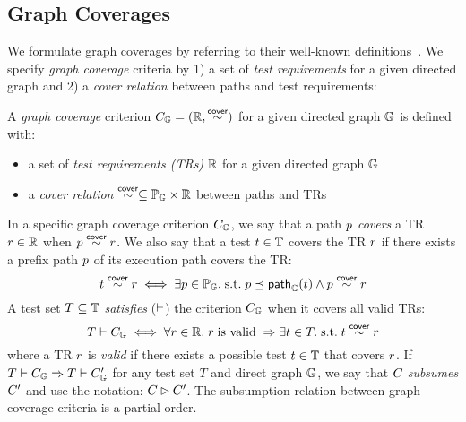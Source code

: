 

\subsection{Graph Coverages}

We formulate graph coverages by referring to their well-known
definitions~\cite{testing}.
%
We specify \textit{graph coverage} criteria by 1) a set of \textit{test
requirements} for a given directed graph and 2) a \textit{cover relation}
between paths and test requirements:


\begin{definition}\label{def:graph-cov}
  A \textit{graph coverage} criterion $C_{\mathbb{G}} = (\mathbb{R}, \overset{\textsf{cover}}{\sim})$
  for a given directed graph $\mathbb{G}$ is defined with:
  \begin{itemize}
    \item a set of \textit{test requirements (TRs)} $\mathbb{R}$ for a given
      directed graph $\mathbb{G}$
    \item a \textit{cover relation} $\overset{\textsf{cover}}{\sim} \subseteq \mathbb{P}_{\mathbb{G}} \times
      \mathbb{R}$ between paths and TRs
  \end{itemize}
\end{definition}


In a specific graph coverage criterion $C_{\mathbb{G}}$, we say that a path $p$
\textit{covers} a TR $r \in \mathbb{R}$ when $p \overset{\textsf{cover}}{\sim}
r$.
%
We also say that a test $t \in \mathbb{T}$ covers the TR $r$ if there exists
a prefix path $p$ of its execution path covers the TR:
%
\begin{equation}\label{equ:test-cover}
  t \overset{\textsf{cover}}{\sim} r
  \iff
  \exists p \in \mathbb{P}_{\mathbb{G}}. {\; \text{s.t.} \; }
  p \preceq \textsf{path}_{\mathbb{G}}(t) \wedge
  p \overset{\textsf{cover}}{\sim} r
\end{equation}
%
A test set $T \subseteq \mathbb{T}$ \textit{satisfies} ($\vdash$) the criterion
$C_{\mathbb{G}}$ when it covers all valid TRs:
\begin{equation}\label{equ:sat}
  T \vdash C_{\mathbb{G}}
  \iff
  \forall r \in \mathbb{R}. \;
  r \; \text{is valid} \; \Rightarrow
  \exists t \in T. {\; \text{s.t.} \; } t \overset{\textsf{cover}}{\sim} r
\end{equation}
where a TR $r$ is \textit{valid} if there exists a possible test $t \in
\mathbb{T}$ that covers $r$.
%
If $T \vdash C_{\mathbb{G}} \Rightarrow T \vdash C_{\mathbb{G}}'$ for any test set $T$
and direct graph $\mathbb{G}$, we say that $C_{}$ \textit{subsumes} $C_{}'$ and
use the notation: $C_{} \rhd C_{}'$.
%
The subsumption relation between graph coverage criteria is a partial order.

